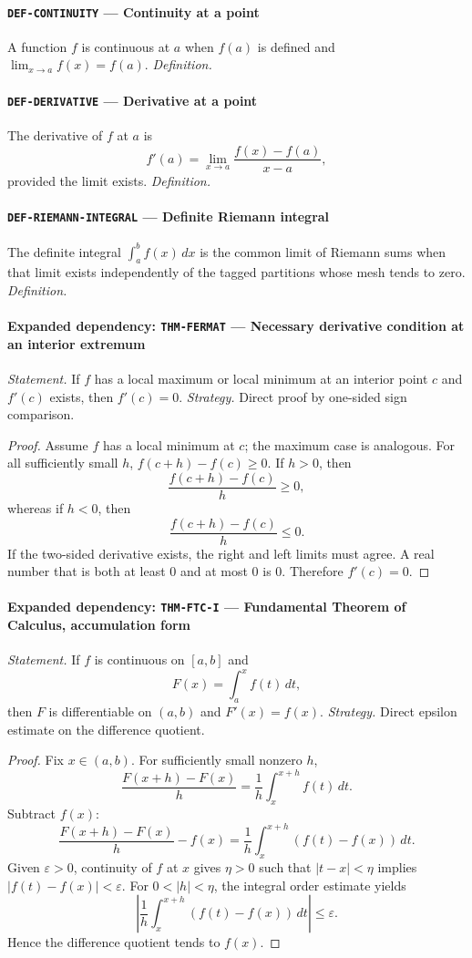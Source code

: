 \documentclass[10pt]{article}
\newcommand{\pidraw}[1]{\begingroup\urlstyle{tt}\nolinkurl{#1}\endgroup}
\theoremstyle{definition}
\theoremstyle{remark}
\begin{document}
\paragraph{\pidraw{DEF-CONTINUITY} --- Continuity at a point}
A function $f$ is continuous at $a$ when $f(a)$ is defined and $\lim_{x\to a}f(x)=f(a)$.
\textit{Definition.}

\paragraph{\pidraw{DEF-DERIVATIVE} --- Derivative at a point}
The derivative of $f$ at $a$ is
\[
f'(a)=\lim_{x\to a}\frac{f(x)-f(a)}{x-a},
\]
provided the limit exists.
\textit{Definition.}

\paragraph{\pidraw{DEF-RIEMANN-INTEGRAL} --- Definite Riemann integral}
The definite integral $\int_a^b f(x)\,dx$ is the common limit of Riemann sums when that limit exists independently of the tagged partitions whose mesh tends to zero.
\textit{Definition.}

\paragraph{Expanded dependency: \pidraw{THM-FERMAT} --- Necessary derivative condition at an interior extremum}
\textit{Statement.} If $f$ has a local maximum or local minimum at an interior point $c$ and $f'(c)$ exists, then $f'(c)=0$.
\textit{Strategy.} Direct proof by one-sided sign comparison.
\begin{proof}Assume $f$ has a local minimum at $c$; the maximum case is analogous.
For all sufficiently small $h$,
$f(c+h)-f(c)\ge0$. If $h>0$, then
\[
\frac{f(c+h)-f(c)}{h}\ge0,
\]
whereas if $h<0$, then
\[
\frac{f(c+h)-f(c)}{h}\le0.
\]
If the two-sided derivative exists, the right and left limits must agree.
A real number that is both at least $0$ and at most $0$ is $0$.
Therefore $f'(c)=0$.\end{proof}

\paragraph{Expanded dependency: \pidraw{THM-FTC-I} --- Fundamental Theorem of Calculus, accumulation form}
\textit{Statement.} If $f$ is continuous on $[a,b]$ and
\[
F(x)=\int_a^x f(t)\,dt,
\]
then $F$ is differentiable on $(a,b)$ and $F'(x)=f(x)$.
\textit{Strategy.} Direct epsilon estimate on the difference quotient.
\begin{proof}Fix $x\in(a,b)$. For sufficiently small nonzero $h$,
\[
\frac{F(x+h)-F(x)}{h}
=
\frac1h\int_x^{x+h}f(t)\,dt.
\]
Subtract $f(x)$:
\[
\frac{F(x+h)-F(x)}{h}-f(x)
=
\frac1h\int_x^{x+h}(f(t)-f(x))\,dt.
\]
Given $\varepsilon>0$, continuity of $f$ at $x$ gives $\eta>0$ such that
$|t-x|<\eta$ implies $|f(t)-f(x)|<\varepsilon$. For $0<|h|<\eta$, the
integral order estimate yields
\[
\left|
\frac1h\int_x^{x+h}(f(t)-f(x))\,dt
\right|
\le \varepsilon.
\]
Hence the difference quotient tends to $f(x)$.\end{proof}
\end{document}

